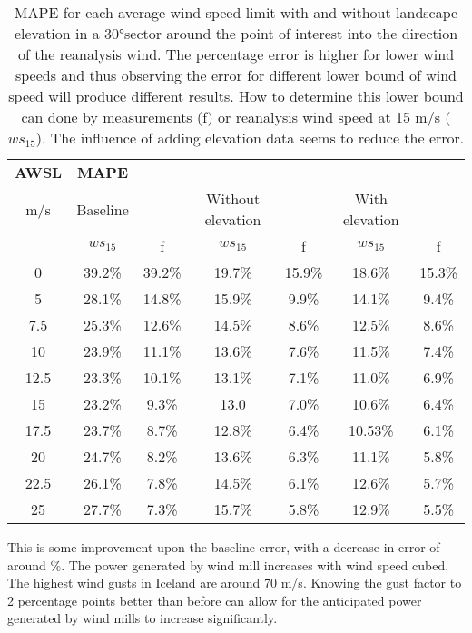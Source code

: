 \begin{table}[h]
    \caption[Model results for different AWSL]{MAPE for each average wind speed limit with and without landscape elevation in a 30°sector around the point of interest into the direction of the reanalysis wind. The percentage error is higher for lower wind speeds and thus observing the error for different lower bound of wind speed will produce different results. How to determine this lower bound can done by measurements (f) or reanalysis wind speed at 15 m/s ($ws_{15}$). The influence of adding elevation data seems to reduce the error.}
    \label{table:results}
    \centering
    \begin{tabular}{c|cccccc}
        \textbf{AWSL} & \textbf{MAPE} & & & & &\\ 
        m/s & Baseline & &  Without elevation & & With elevation & \\
            & $ws_{15}$ & f & $ws_{15}$ & f & $ws_{15}$ & f\\\hline
        0 & 39.2\% & 39.2\% & 19.7\% & 15.9\% & 18.6\% & 15.3\%\\
        5 & 28.1\% & 14.8\% & 15.9\% & 9.9\% & 14.1\% & 9.4\%\\
        7.5 & 25.3\% & 12.6\% & 14.5\% & 8.6\% & 12.5\% & 8.6\%\\
        10 & 23.9\% & 11.1\%& 13.6\% & 7.6\% & 11.5\% & 7.4\%\\
        12.5 & 23.3\% & 10.1\% & 13.1\% & 7.1\% & 11.0\% & 6.9\%\\
        15 & 23.2\% & 9.3\% & 13.0 & 7.0\% & 10.6\% & 6.4\%\\
        17.5 & 23.7\% & 8.7\% & 12.8\% & 6.4\% & 10.53\% & 6.1\%\\
        20 & 24.7\% & 8.2\% & 13.6\% & 6.3\% & 11.1\% & 5.8\%\\
        22.5 & 26.1\% & 7.8\% & 14.5\% & 6.1\% & 12.6\% & 5.7\%\\
        25 & 27.7\% & 7.3\% & 15.7\% & 5.8\% & 12.9\% & 5.5\% \\
    \end{tabular}
\end{table}

This is some improvement upon the baseline error, with a decrease in error of around \errorImprovement\%. The power generated by wind mill increases with wind speed cubed\cite{wind_power}. The highest wind gusts in Iceland are around 70 m/s. Knowing the gust factor to 2 percentage points better than before can allow for the anticipated power generated by wind mills to increase significantly.

